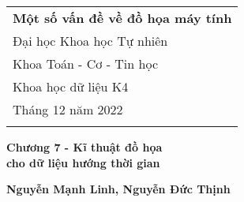 \documentclass[a4paper,12pt]{article} %
\begin{document}



\thispagestyle{empty} %

\begin{tabular}{p{15.5cm}} %
{\large \bf Một số vấn đề về đồ họa máy tính} \\
Đại học Khoa học Tự nhiên \\
Khoa Toán - Cơ - Tin học \\ 
Khoa học dữ liệu K4 \\
Tháng 12 năm 2022  \\ 
\hline %
\\
\end{tabular} %

\vspace*{0.3cm} %

\begin{center} %
	{\Large \bf Chương 7 - Kĩ thuật đồ họa \\ cho dữ liệu hướng thời gian} %
	\vspace{2mm}
	
	{\bf Nguyễn Mạnh Linh, Nguyễn Đức Thịnh} %
		
\end{center}  

\vspace{0.4cm}









\end{document}
